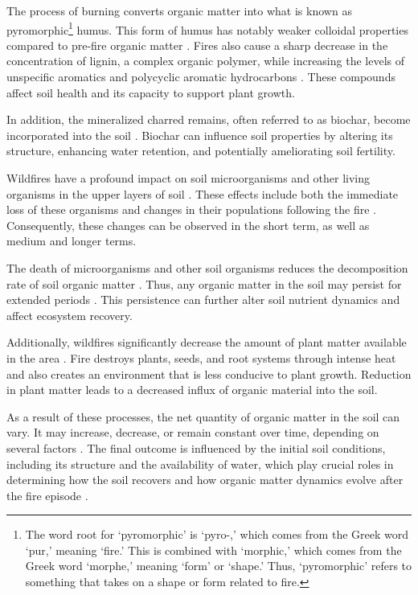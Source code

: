 \documentclass[
  12 pt,
]{Nemilov}
\begin{document}
The process of burning converts organic matter into what is known as pyromorphic\footnote{The word root for `pyromorphic' is `pyro-,' which comes from the Greek word `pur,' meaning `fire.' This is combined with `morphic,' which comes from the Greek word `morphe,' meaning `form' or `shape.' Thus, `pyromorphic' refers to something that takes on a shape or form related to fire.} humus. This form of humus has notably weaker colloidal properties compared to pre-fire organic matter \citep{gonzalez2004effect}. Fires also cause a sharp decrease in the concentration of lignin, a complex organic polymer, while increasing the levels of unspecific aromatics and polycyclic aromatic hydrocarbons \citep{jimenez2020effect, merino2018inferring}. These compounds affect soil health and its capacity to support plant growth.

In addition, the mineralized charred remains, often referred to as biochar, become incorporated into the soil \citep{fernandez1997organic, knicker2007does}. Biochar can influence soil properties by altering its structure, enhancing water retention, and potentially ameliorating soil fertility.

Wildfires have a profound impact on soil microorganisms and other living organisms in the upper layers of soil \citep{borgogni2019immediate, koster2021impacts}. These effects include both the immediate loss of these organisms and changes in their populations following the fire \citep{acea1996changes, ginzburg2012effects, rodriguez2017wildfire}. Consequently, these changes can be observed in the short term, as well as medium and longer terms.

The death of microorganisms and other soil organisms reduces the decomposition rate of soil organic matter \citep{visser1999wildfire}. Thus, any organic matter in the soil may persist for extended periods \citep{holden2013changes}. This persistence can further alter soil nutrient dynamics and affect ecosystem recovery.

Additionally, wildfires significantly decrease the amount of plant matter available in the area \citep{bartels2016trends, cuevas2009analysing}. Fire destroys plants, seeds, and root systems through intense heat and also creates an environment that is less conducive to plant growth. Reduction in plant matter leads to a decreased influx of organic material into the soil.

As a result of these processes, the net quantity of organic matter in the soil can vary. It may increase, decrease, or remain constant over time, depending on several factors \citep{kelly2021boreal, pellegrini2022fire}. The final outcome is influenced by the initial soil conditions, including its structure and the availability of water, which play crucial roles in determining how the soil recovers and how organic matter dynamics evolve after the fire episode \citep{aedo2021numerical}.
\end{document}
